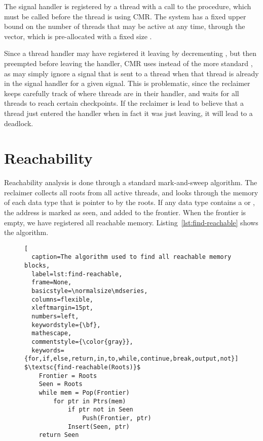 The signal handler is registered by a thread with a call to the  procedure,
which must be called before the thread is using CMR\@. 
The system has a fixed upper bound on the number of threads that may be active at any time, through
the  vector, which is pre-allocated with a fixed size .

Since a thread handler may have registered it leaving by decrementing ,
but then preempted before leaving the handler, CMR uses  instead of the more
standard , as  may simply ignore a signal that is sent to a
thread when that thread is already in the signal handler for a given signal.
This is problematic, since the reclaimer keeps carefully track of where threads are in their
handler, and waits for all threads to reach certain checkpoints. If the reclaimer is lead to
believe that a thread just entered the handler when in fact it was just leaving, it will lead to a
deadlock.


\section{Reachability\label{sec:reachability}}

Reachability analysis is done through a standard mark-and-sweep algorithm. The reclaimer collects
all roots from all active threads, and looks through the memory of each data type that is pointer
to by the roots. If any data type contains a  or , the address is marked as seen,
and added to the frontier. When the frontier is empty, we have registered all reachable memory.
Listing~\ref{lst:find-reachable} shows the algorithm.

\begin{figure}[ht]
\begin{lstlisting}[
  caption=The algorithm used to find all reachable memory blocks,
  label=lst:find-reachable,
  frame=None,
  basicstyle=\normalsize\mdseries,
  columns=flexible,
  xleftmargin=15pt,
  numbers=left,
  keywordstyle={\bf},
  mathescape,
  commentstyle={\color{gray}},
  keywords={for,if,else,return,in,to,while,continue,break,output,not}]
$\textsc{find-reachable(Roots)}$
    Frontier = Roots
    Seen = Roots
    while mem = Pop(Frontier)
        for ptr in Ptrs(mem)
            if ptr not in Seen
                Push(Frontier, ptr)
            Insert(Seen, ptr)
    return Seen
\end{lstlisting}
\end{figure}

